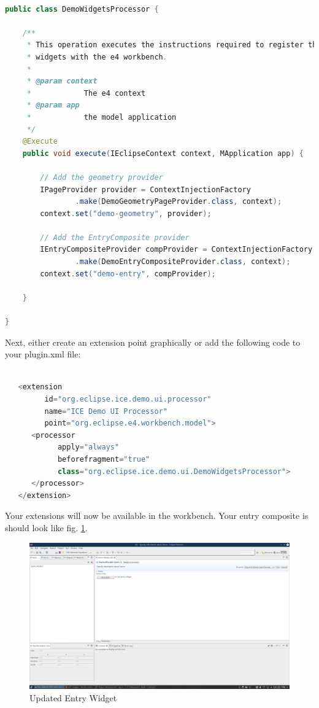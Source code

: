 \begin{lstlisting}[language=java]

public class DemoWidgetsProcessor {

	/**
	 * This operation executes the instructions required to register the demo
	 * widgets with the e4 workbench.
	 * 
	 * @param context
	 *            The e4 context
	 * @param app
	 *            the model application
	 */
	@Execute
	public void execute(IEclipseContext context, MApplication app) {

		// Add the geometry provider
		IPageProvider provider = ContextInjectionFactory
				.make(DemoGeometryPageProvider.class, context);
		context.set("demo-geometry", provider);

		// Add the EntryComposite provider
		IEntryCompositeProvider compProvider = ContextInjectionFactory
				.make(DemoEntryCompositeProvider.class, context);
		context.set("demo-entry", compProvider);

	}

}

\end{lstlisting}

Next, either create an extension point graphically or add the following code to
your plugin.xml file:

\begin{lstlisting}[language=java]

   <extension
         id="org.eclipse.ice.demo.ui.processor"
         name="ICE Demo UI Processor"
         point="org.eclipse.e4.workbench.model">
      <processor
            apply="always"
            beforefragment="true"
            class="org.eclipse.ice.demo.ui.DemoWidgetsProcessor">
      </processor>
   </extension>

\end{lstlisting}

Your extensions will now be available in the workbench. Your entry composite is
should look like fig. \ref{fig:iceDemoEntryComposite}.

\begin{figure}[h]
\includegraphics[width=\textwidth]{pics/dynamicUI_demoEntryComposite.png}
\caption{Updated Entry Widget}
\label{fig:iceDemoEntryComposite}
\end{figure}

